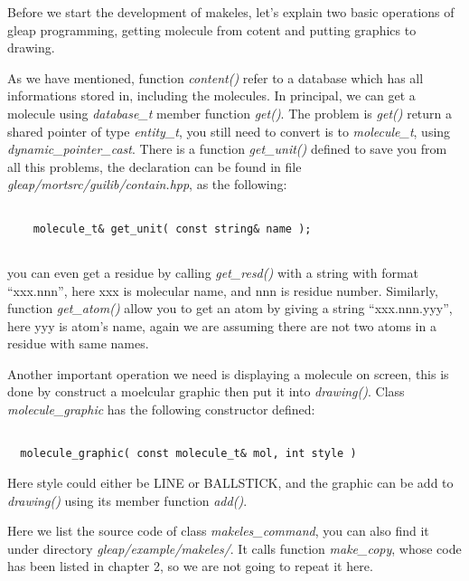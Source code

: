 \documentclass[letterpaper]{book}
\begin{document}
Before we start the development of makeles, let's explain two basic operations
of gleap programming, getting molecule from cotent and putting graphics to drawing.


As we have mentioned, function {\it content()} refer to a database which has all
informations stored in, including the molecules. In principal, we can get a molecule
using {\it database\_t} member function {\it get()}. The problem is {\it get()} return
a shared pointer of type {\it entity\_t}, you still need to convert is to {\it molecule\_t},
using {\it dynamic\_pointer\_cast}. There is a function {\it get\_unit()} defined to
save you from all this problems, the declaration can be found in file 
{\it gleap/mortsrc/guilib/contain.hpp}, as the following:

\begin{lstlisting}

    molecule_t& get_unit( const string& name );
    
\end{lstlisting}

you can even get a residue by calling {\it get\_resd()} with a string with format ``xxx.nnn'', 
here xxx is molecular name, and nnn is residue number. Similarly, function {\it get\_atom()}
allow you to get an atom by giving a string ``xxx.nnn.yyy'', here yyy is atom's name, again
we are assuming there are not two atoms in a residue with same names.


Another important operation we need is displaying a molecule on screen, this is done by 
construct a moelcular graphic then put it into {\it drawing()}. Class {\it molecule\_graphic}
has the following constructor defined:

\begin{lstlisting}

  molecule_graphic( const molecule_t& mol, int style )

\end{lstlisting}

Here style could either be LINE or BALLSTICK, and the graphic can be add to {\it drawing()}
using its member function {\it add()}.

Here we list the source code of class {\it makeles\_command}, you can also find it under directory
{\it gleap/example/makeles/}. It calls function {\it make\_copy}, whose code has been listed in 
chapter 2, so we are not going to repeat it here.
\end{document}
